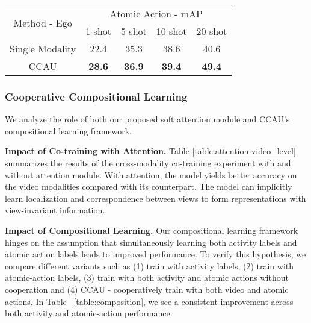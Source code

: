 \documentclass[final]{cvpr}
\begin{document}
\begin{table}[tb]
\centering
\renewcommand{\arraystretch}{1.0}
\renewcommand{\tabcolsep}{2mm}
\small
\begin{tabular}{c|c|c|c|c}
    \toprule
    \multirow{2}{*}{Method - Ego} & \multicolumn{4}{c}{Atomic Action - mAP}\\
    & \multicolumn{1}{c|}{1 shot} & 5 shot & 10 shot & 20 shot \\
    \midrule
    Single Modality & 22.4 & 35.3 & 38.6 & 40.6 \\
    CCAU            & \textbf{28.6} & \textbf{36.9} & \textbf{39.4} & \textbf{49.4} \\
    \bottomrule
\end{tabular}
\normalsize
\vspace{-5pt}
\vspace{-10pt}
\label{table:few-shot}
\end{table}



\subsubsection{Cooperative Compositional Learning}

We analyze the role of both our proposed soft attention module and CCAU's compositional learning framework.

\noindent\textbf{Impact of Co-training with Attention.} Table \ref{table:attention-video_level} summarizes the results of the cross-modality co-training experiment with and without attention module. With attention, the model yields better accuracy on the video modalities compared with its counterpart. The model can implicitly learn localization and correspondence between views to form representations with view-invariant information.

\noindent\textbf{Impact of Compositional Learning.} Our compositional learning framework hinges on the assumption that simultaneously learning both activity labels and atomic action labels leads to improved performance. To verify this hypothesis, we compare different variants such as (1) train with activity labels, (2) train with atomic-action labels, (3) train with both activity and atomic actions without cooperation and (4) CCAU - cooperatively train with both video and atomic actions. In Table ~\ref{table:composition}, we see a consistent improvement across both activity and atomic-action performance.
\end{document}
